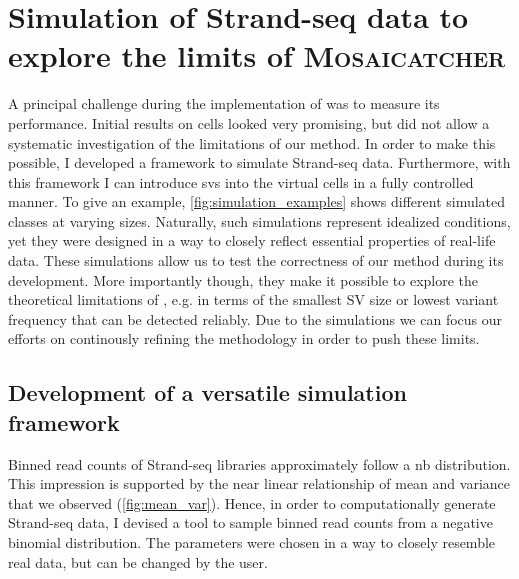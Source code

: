 \FloatBarrier
\section{Simulation of Strand-seq data to explore the limits of \textsc{Mosaicatcher}}
\label{sec:mosaic_simul}

A principal challenge during the implementation of \mc was to measure its
performance. Initial results on  cells looked very promising, but did not
allow a systematic investigation of the limitations of our method. In order to
make this possible, I developed a framework to simulate Strand-seq data.
Furthermore, with this framework I can introduce \acp{sv}  into the virtual cells in a fully
controlled manner. To give an example, \cref{fig:simulation_examples} shows
different simulated \sv classes at varying sizes. Naturally, such simulations
represent idealized conditions, yet they were designed in a way to closely
reflect essential properties of real-life data.
These simulations allow us to test the correctness of our method during its
development. More importantly though, they make it possible to explore the
theoretical limitations of \mc, e.g. in terms of the smallest SV size or lowest
variant frequency that can be detected reliably. Due to the
simulations we can focus our efforts on continously refining the methodology in
order to push these limits.





\subsection{Development of a versatile simulation framework}
\label{sec:mosaic_simul_framework}

Binned read counts of Strand-seq libraries approximately follow a \acl{nb}
distribution. This impression is supported by the near linear relationship of
mean and variance that we observed (\cref{fig:mean_var}). Hence, in order to
computationally generate Strand-seq data, I devised a tool to sample binned read
counts from a negative binomial distribution. The \nb parameters were chosen
in a way to closely resemble real data, but can be changed by the user.

